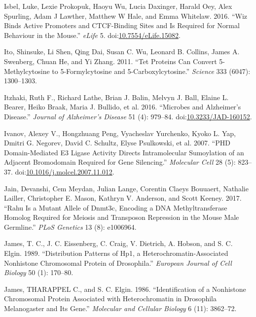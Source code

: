 \documentclass[onehalf,12pt]{beavtex}
\begin{document}
  \hypertarget{ref-IsbelWizbindsactive2016}{}
  Isbel, Luke, Lexie Prokopuk, Haoyu Wu, Lucia Daxinger, Harald Oey, Alex
  Spurling, Adam J Lawther, Matthew W Hale, and Emma Whitelaw. 2016. ``Wiz
  Binds Active Promoters and CTCF-Binding Sites and Is Required for Normal
  Behaviour in the Mouse.'' \emph{eLife} 5.
  doi:\href{https://doi.org/10.7554/eLife.15082}{10.7554/eLife.15082}.
  
  \hypertarget{ref-ItoTetproteinscan2011}{}
  Ito, Shinsuke, Li Shen, Qing Dai, Susan C. Wu, Leonard B. Collins, James
  A. Swenberg, Chuan He, and Yi Zhang. 2011. ``Tet Proteins Can Convert
  5-Methylcytosine to 5-Formylcytosine and 5-Carboxylcytosine.''
  \emph{Science} 333 (6047): 1300--1303.
  
  \hypertarget{ref-ItzhakiMicrobesAlzheimerDisease2016}{}
  Itzhaki, Ruth F., Richard Lathe, Brian J. Balin, Melvyn J. Ball, Elaine
  L. Bearer, Heiko Braak, Maria J. Bullido, et al. 2016. ``Microbes and
  Alzheimer's Disease.'' \emph{Journal of Alzheimer's Disease} 51 (4):
  979--84.
  doi:\href{https://doi.org/10.3233/JAD-160152}{10.3233/JAD-160152}.
  
  \hypertarget{ref-IvanovPHDDomainMediatedE32007}{}
  Ivanov, Alexey V., Hongzhuang Peng, Vyacheslav Yurchenko, Kyoko L. Yap,
  Dmitri G. Negorev, David C. Schultz, Elyse Psulkowski, et al. 2007.
  ``PHD Domain-Mediated E3 Ligase Activity Directs Intramolecular
  Sumoylation of an Adjacent Bromodomain Required for Gene Silencing.''
  \emph{Molecular Cell} 28 (5): 823--37.
  doi:\href{https://doi.org/10.1016/j.molcel.2007.11.012}{10.1016/j.molcel.2007.11.012}.
  
  \hypertarget{ref-Jainrahumutantallele2017}{}
  Jain, Devanshi, Cem Meydan, Julian Lange, Corentin Claeys Bouuaert,
  Nathalie Lailler, Christopher E. Mason, Kathryn V. Anderson, and Scott
  Keeney. 2017. ``Rahu Is a Mutant Allele of Dnmt3c, Encoding a DNA
  Methyltransferase Homolog Required for Meiosis and Transposon Repression
  in the Mouse Male Germline.'' \emph{PLoS Genetics} 13 (8): e1006964.
  
  \hypertarget{ref-JamesDistributionpatternsHP11989}{}
  James, T. C., J. C. Eissenberg, C. Craig, V. Dietrich, A. Hobson, and S.
  C. Elgin. 1989. ``Distribution Patterns of Hp1, a
  Heterochromatin-Associated Nonhistone Chromosomal Protein of
  Drosophila.'' \emph{European Journal of Cell Biology} 50 (1): 170--80.
  
  \hypertarget{ref-JamesIdentificationnonhistonechromosomal1986}{}
  James, THARAPPEL C., and S. C. Elgin. 1986. ``Identification of a
  Nonhistone Chromosomal Protein Associated with Heterochromatin in
  Drosophila Melanogaster and Its Gene.'' \emph{Molecular and Cellular
  Biology} 6 (11): 3862--72.
  
\end{document}
